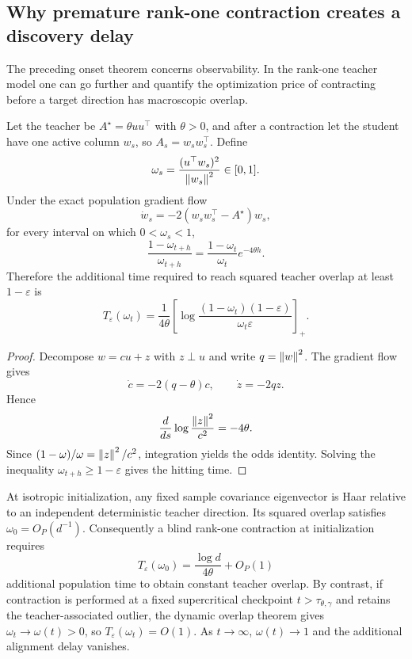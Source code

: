 \subsection{Why premature rank-one contraction creates a discovery delay}
The preceding onset theorem concerns observability. In the rank-one teacher model one can go further and quantify the optimization price of contracting before a target direction has macroscopic overlap.

\begin{proposition}\label{prop:rankone-angle}
Let the teacher be $A^\star=\theta uu^\top$ with $\theta>0$, and after a contraction let the student have one active column $w_s$, so $A_s=w_sw_s^\top$. Define
\[
\omega_s=\frac{(u^\top w_s)^2}{\left\lVert w_s\right\rVert^2}\in[0,1].
\]
Under the exact population gradient flow
\[
\dot w_s=-2(w_sw_s^\top-A^\star)w_s,
\]
for every interval on which $0<\omega_s<1$,
\[
\boxed{
\frac{1-\omega_{t+h}}{\omega_{t+h}}
=
\frac{1-\omega_t}{\omega_t}e^{-4\theta h}.}
\]
Therefore the additional time required to reach squared teacher overlap at least $1-\varepsilon$ is
\[
\boxed{
T_\varepsilon(\omega_t)
=
\frac{1}{4\theta}
\left[
\log\frac{(1-\omega_t)(1-\varepsilon)}{\omega_t\varepsilon}
\right]_+.}
\]
\end{proposition}

\begin{proof}
Decompose $w=cu+z$ with $z\perp u$ and write $q=\left\lVert w\right\rVert^2$. The gradient flow gives
\[
\dot c=-2(q-\theta)c,
\qquad
\dot z=-2qz.
\]
Hence
\[
\frac{d}{ds}\log\frac{\left\lVert z\right\rVert^2}{c^2}=-4\theta.
\]
Since $(1-\omega)/\omega=\left\lVert z\right\rVert^2/c^2$, integration yields the odds identity. Solving the inequality $\omega_{t+h}\ge1-\varepsilon$ gives the hitting time.
\end{proof}

\begin{corollary}\label{cor:discovery-delay}
At isotropic initialization, any fixed sample covariance eigenvector is Haar relative to an independent deterministic teacher direction. Its squared overlap satisfies $\omega_0=O_P(d^{-1})$. Consequently a blind rank-one contraction at initialization requires
\[
T_\varepsilon(\omega_0)
=
\frac{\log d}{4\theta}+O_P(1)
\]
additional population time to obtain constant teacher overlap. By contrast, if contraction is performed at a fixed supercritical checkpoint $t>\tau_{\theta,\gamma}$ and retains the teacher-associated outlier, the dynamic overlap theorem gives $\omega_t\to\omega(t)>0$, so $T_\varepsilon(\omega_t)=O(1)$. As $t\to\infty$, $\omega(t)\to1$ and the additional alignment delay vanishes.
\end{corollary}


